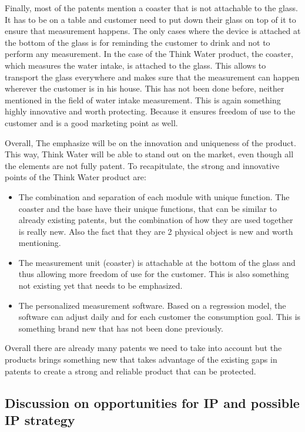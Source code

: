 \documentclass{article}
\begin{document}
Finally, most of the patents mention a coaster that is not attachable to the glass. It has to be on a table and customer need to put down their glass on top of it to ensure that measurement happens. The only cases where the device is attached at the bottom of the glass is for reminding the customer to drink and not to perform any measurement. In the case of the Think Water product, the coaster, which measures the water intake, is attached to the glass. This allows to transport the glass everywhere and makes sure that the measurement can happen wherever the customer is in his house. This has not been done before, neither mentioned in the field of water intake measurement. This is again something highly innovative and worth protecting. Because it ensures freedom of use to the customer and is a good marketing point as well.\vspace{0.2cm}

Overall, The emphasize will be on the innovation and uniqueness of the product. This way, Think Water will be able to stand out on the market, even though all the elements are not fully patent.
To recapitulate, the strong and innovative points of the Think Water product are: 
\begin{itemize}
    \item The combination and separation of each module with unique function. The coaster and the base have their unique functions, that can be similar to already existing patents, but the combination of how they are used together is really new. Also the fact that they are 2 physical object is new and worth mentioning.
    \item The measurement unit (coaster) is attachable at the bottom of the glass and thus allowing more freedom of use for the customer. This is also something not existing yet that needs to be emphasized. 
    \item The personalized measurement software. Based on a regression model, the software can adjust daily and for each customer the consumption goal. This is something brand new that has not been done previously. 
\end{itemize} 

Overall there are already many patents we need to take into account but the products brings something new that takes advantage of the existing gaps in patents to create a strong and reliable product that can be protected.


\subsection{Discussion on opportunities for IP and possible IP strategy}
\end{document}
